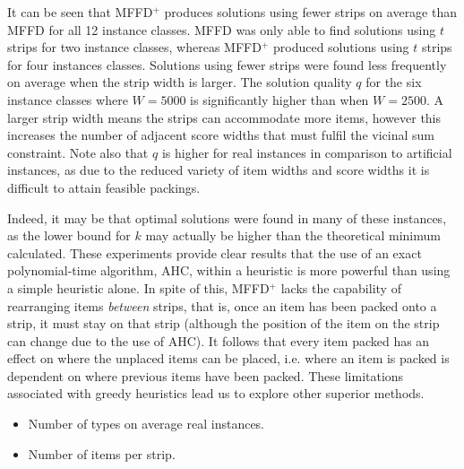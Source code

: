 \documentclass{elsarticle}
\begin{document}
It can be seen that MFFD$^+$ produces solutions using fewer strips on average than MFFD for all 12 instance classes. MFFD was only able to find solutions using $t$ strips for two instance classes, whereas MFFD$^+$ produced solutions using $t$ strips for four instances classes. Solutions using fewer strips were found less frequently on average when the strip width is larger. The solution quality $q$ for the six instance classes where $W = 5000$ is significantly higher than when $W = 2500$. A larger strip width means the strips can accommodate more items, however this increases the number of adjacent score widths that must fulfil the vicinal sum constraint. Note also that $q$ is higher for real instances in comparison to artificial instances, as due to the reduced variety of item widths and score widths it is difficult to attain feasible packings. 

Indeed, it may be that optimal solutions were found in many of these instances, as the lower bound for $k$ may actually be higher than the theoretical minimum calculated. These experiments provide clear results that the use of an exact polynomial-time algorithm, AHC, within a heuristic is more powerful than using a simple heuristic alone. In spite of this, MFFD$^+$ lacks the capability of rearranging items \emph{between} strips, that is, once an item has been packed onto a strip, it must stay on that strip (although the position of the item on the strip can change due to the use of AHC). It follows that every item packed has an effect on where the unplaced items can be placed, i.e. where an item is packed is dependent on where previous items have been packed. These limitations associated with greedy heuristics lead us to explore other superior methods. 

{\color{myPink}
\begin{itemize}[leftmargin=*]
	\item Number of types on average real instances.
	\item Number of items per strip.
\end{itemize}
}

\end{document}
